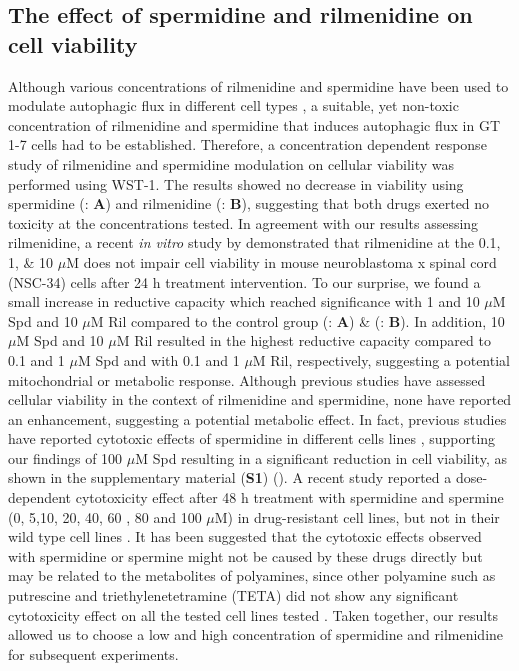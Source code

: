 {\subsection{The effect of spermidine and rilmenidine on cell viability}

Although various concentrations of rilmenidine and spermidine have been used to modulate autophagic flux in different cell types \citep{Perera2018,Wang2018}, a suitable, yet non-toxic concentration of rilmenidine and spermidine that induces autophagic flux in GT 1-7 cells had to be established. Therefore, a concentration dependent response study of rilmenidine and spermidine modulation on cellular viability was performed using WST-1. The results showed no decrease in viability using spermidine (: \textbf{A}) and rilmenidine (: \textbf{B}), suggesting that both drugs exerted no toxicity at the concentrations tested. In agreement with our results assessing rilmenidine,  a recent \textit{in vitro} study by \citet{Perera2018} demonstrated that rilmenidine  at the  0.1, 1, \& 10 $\mu$M does not impair cell viability in mouse neuroblastoma x spinal cord (NSC-34) cells after 24 h treatment intervention. To our surprise, we found a small increase in reductive capacity which reached significance with 1 and 10 $\mu$M Spd and 10 $\mu$M Ril compared to the control group (: \textbf{A})  \& (: \textbf{B}). In addition, 10 $\mu$M Spd and 10 $\mu$M Ril resulted in the highest reductive capacity compared to 0.1 and 1 $\mu$M Spd and with 0.1 and 1 $\mu$M Ril, respectively, suggesting a potential mitochondrial or metabolic response. Although previous studies have assessed cellular viability in the context of rilmenidine and spermidine, none have reported an enhancement, suggesting a potential metabolic effect. In fact, previous studies  have reported cytotoxic effects of spermidine in different cells lines \citep{He1993,Poulin1995,Poulin1993}, supporting our findings of 100 $\mu$M Spd resulting in a significant reduction in cell viability, as shown in the supplementary material (\textbf{S1}) (). A recent study reported a dose-dependent cytotoxicity effect after 48 h treatment with spermidine and spermine (0, 5,10, 20, 40, 60 , 80 and 100 $\mu$M) in drug-resistant cell lines, but not in their wild type cell lines \citep{Wang2018}. It has been suggested that the cytotoxic effects observed with spermidine or spermine might not be caused by these drugs directly but may be related to the metabolites of polyamines, since other polyamine such as putrescine and triethylenetetramine (TETA) did not show any significant cytotoxicity effect on all the tested cell lines tested \citep{Wang2018}. Taken together, our results allowed us to choose a low and high concentration of spermidine and rilmenidine for subsequent experiments.

}

